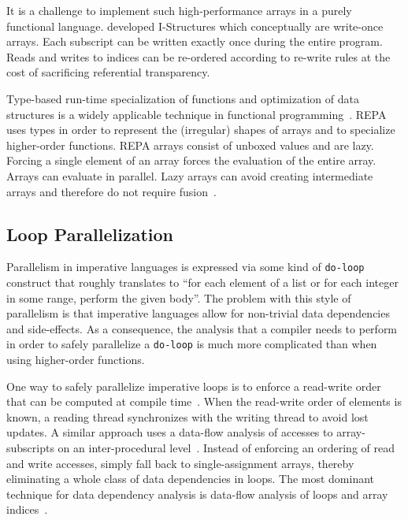 \documentclass[a4paper]{article}
\begin{document}
It is a challenge to implement such high-performance arrays in a purely functional language. \citet{Arvind:1989:IDS:69558.69562} developed I-Structures which conceptually are write-once arrays. Each subscript can be written exactly once during the entire program. Reads and writes to indices can be re-ordered according to re-write rules at the cost of sacrificing referential transparency.

Type-based run-time specialization of functions and optimization of data structures is a widely applicable technique in functional programming~\cite{Hall:1994:UHT:182409.156781}. REPA~\cite{Keller:2010:RSP:1863543.1863582} uses types in order to represent the (irregular) shapes of arrays and to specialize higher-order functions. REPA arrays consist of unboxed values and are lazy. Forcing a single element of an array forces the evaluation of the entire array. Arrays can evaluate in parallel. Lazy arrays can avoid creating intermediate arrays and therefore do not require fusion~\cite{Keller:2010:RSP:1863543.1863582}.

\subsection{Loop Parallelization}
\label{sec:loop-parallelization}

Parallelism in imperative languages is expressed via some kind of \texttt{do-loop} construct that roughly translates to ``for each element of a list or for each integer in some range, perform the given body''. The problem with this style of parallelism is that imperative languages allow for non-trivial data dependencies and side-effects. As a consequence, the analysis that a compiler needs to perform in order to safely parallelize a \texttt{do-loop} is much more complicated than when using higher-order functions.

One way to safely parallelize imperative loops is to enforce a read-write order that can be computed at compile time~\cite{Tang:1990:CTD:77726.255155}. When the read-write order of elements is known, a reading thread synchronizes with the writing thread to avoid lost updates. A similar approach uses a data-flow analysis of accesses to array-subscripts on an inter-procedural level~\cite{Maydan:1993:AFA:158511.158515}. Instead of enforcing an ordering of read and write accesses, \citet{Knobe:1998:ASF:268946.268956} simply fall back to single-assignment arrays, thereby eliminating a whole class of data dependencies in loops. The most dominant technique for data dependency analysis is data-flow analysis of loops and array indices~\cite{Maydan:1993:AFA:158511.158515, Knobe:1998:ASF:268946.268956}.
\end{document}
